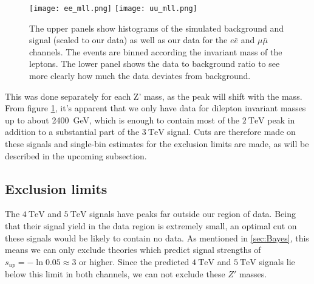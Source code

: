 \documentclass{article}
\begin{document}
\begin{titlepage}
{%

\begin{figure}[H]
    \begin{center}
        \texttt{[image: ee\_mll.png]}
        \texttt{[image: uu\_mll.png]}
        \caption{The upper panels show histograms of the simulated background and signal (scaled to our data) as well as our data for the $e\bar{e}$ and $\mu \bar{\mu}$ channels. The events are binned according the invariant mass of the leptons. The lower panel shows the data to background ratio to see more clearly how much the data deviates from background.}
        \label{fig:ee_mll_6TeV}
     \end{center}
\end{figure}


This was done separately for each Z' mass, as the peak will shift with the mass. From figure \ref{fig:ee_mll_6TeV}, it's apparent that we only have data for dilepton invariant masses up to about \SI{2400}{\giga\eV}, which is enough to contain most of the $\SI{2}{\tera \eV}$ peak in addition to a substantial part of the $\SI{3}{\tera \eV}$ signal. Cuts are therefore made on these signals and single-bin estimates for the exclusion limits are made, as will be described in the upcoming subsection. 

\subsection{Exclusion limits}
The $\SI{4}{\tera \eV}$ and  $\SI{5}{\tera \eV}$ signals have peaks far outside our region of data. Being that their signal yield in the data region is extremely small, an optimal cut on these signals would be likely to contain no data. As mentioned in \ref{sec:Bayes}, this means we can only exclude theories which predict signal strengths of $s_{up} = -\ln 0.05 \approx 3$ or higher. Since the predicted $\SI{4}{\tera \eV}$ and  $\SI{5}{\tera \eV}$ signals lie below this limit in both channels, we can not exclude these $Z'$ masses.

}
\end{titlepage}
\end{document}
